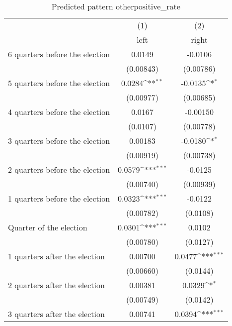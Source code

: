 \begin{table}[htbp]\centering
\def\sym#1{\ifmmode^{#1}\else\(^{#1}\)\fi}
\caption{Predicted pattern otherpositive\_rate}
\begin{tabular}{l*{2}{c}}
\hline\hline
                    &\multicolumn{1}{c}{(1)}&\multicolumn{1}{c}{(2)}\\
                    &\multicolumn{1}{c}{left}&\multicolumn{1}{c}{right}\\
\hline
 6 quarters before the election&      0.0149         &     -0.0106         \\
                    &   (0.00843)         &   (0.00786)         \\
[1em]
 5 quarters before the election&      0.0284\sym{**} &     -0.0135\sym{*}  \\
                    &   (0.00977)         &   (0.00685)         \\
[1em]
 4 quarters before the election&      0.0167         &    -0.00150         \\
                    &    (0.0107)         &   (0.00778)         \\
[1em]
 3 quarters before the election&     0.00183         &     -0.0180\sym{*}  \\
                    &   (0.00919)         &   (0.00738)         \\
[1em]
 2 quarters before the election&      0.0579\sym{***}&     -0.0125         \\
                    &   (0.00740)         &   (0.00939)         \\
[1em]
 1 quarters before the election&      0.0323\sym{***}&     -0.0122         \\
                    &   (0.00782)         &    (0.0108)         \\
[1em]
Quarter of the election&      0.0301\sym{***}&      0.0102         \\
                    &   (0.00780)         &    (0.0127)         \\
[1em]
 1 quarters after the election&     0.00700         &      0.0477\sym{***}\\
                    &   (0.00660)         &    (0.0144)         \\
[1em]
 2 quarters after the election&     0.00381         &      0.0329\sym{*}  \\
                    &   (0.00749)         &    (0.0142)         \\
[1em]
 3 quarters after the election&     0.00741         &      0.0394\sym{***}\\

\end{tabular}
\end{table}
